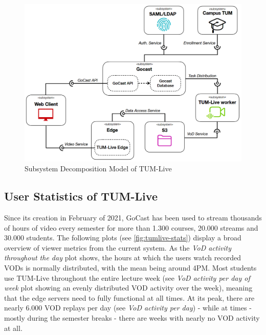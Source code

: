 \begin{figure}[htpb]
    \centering
    \includegraphics[width=420pt]{images/OldDeploymentDiagram2.png}
    \caption[Subsystem Decomposition]{Subsystem Decomposition Model of TUM-Live}\label{fig:old-system-architecture}
\end{figure}

\subsection{User Statistics of TUM-Live}\label{subsection:user-stats-tumlive}

Since its creation in February of 2021, GoCast has been used to stream thousands of hours of video every semester for more than 1.300 courses, 20.000 streams and 30.000 students. The following plots (see \autoref{fig:tumlive-stats}) display a broad overview of viewer metrics from the current system. As the \textit{VoD activity throughout the day} plot shows, the hours at which the users watch recorded \ac{VOD}s is normally distributed, with the mean being around 4PM. Most students use TUM-Live throughout the entire lecture week (see \textit{VoD activity per day of week} plot showing an evenly distributed \ac{VOD} activity over the week), meaning that the edge servers need to fully functional at all times. At its peak, there are nearly 6.000 \ac{VOD} replays per day (see \textit{VoD activity per day}) - while at times - mostly during the semester breaks - there are weeks with nearly no \ac{VOD} activity at all.

